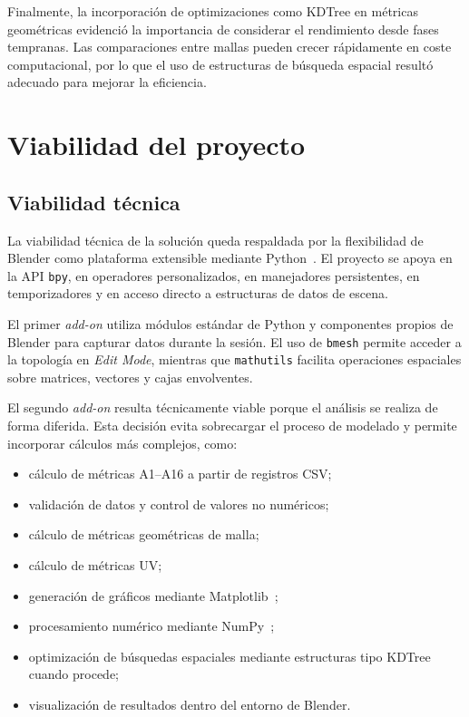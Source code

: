 Finalmente, la incorporación de optimizaciones como KDTree en métricas geométricas evidenció la importancia de considerar el rendimiento desde fases tempranas. Las comparaciones entre mallas pueden crecer rápidamente en coste computacional, por lo que el uso de estructuras de búsqueda espacial resultó adecuado para mejorar la eficiencia.

\section{Viabilidad del proyecto}
\label{sec:a-viabilidad}

\subsection{Viabilidad técnica}
\label{subsec:a-viabilidad-tecnica}

La viabilidad técnica de la solución queda respaldada por la flexibilidad de Blender como plataforma extensible mediante Python~\cite{pythonlang}. El proyecto se apoya en la API \texttt{bpy}, en operadores personalizados, en manejadores persistentes, en temporizadores y en acceso directo a estructuras de datos de escena.

El primer \textit{add-on} utiliza módulos estándar de Python y componentes propios de Blender para capturar datos durante la sesión. El uso de \texttt{bmesh} permite acceder a la topología en \textit{Edit Mode}, mientras que \texttt{mathutils} facilita operaciones espaciales sobre matrices, vectores y cajas envolventes.

El segundo \textit{add-on} resulta técnicamente viable porque el análisis se realiza de forma diferida. Esta decisión evita sobrecargar el proceso de modelado y permite incorporar cálculos más complejos, como:

\begin{itemize}
    \item cálculo de métricas A1--A16 a partir de registros CSV;
    \item validación de datos y control de valores no numéricos;
    \item cálculo de métricas geométricas de malla;
    \item cálculo de métricas UV;
    \item generación de gráficos mediante Matplotlib~\cite{matplotlib};
    \item procesamiento numérico mediante NumPy~\cite{numpy};
    \item optimización de búsquedas espaciales mediante estructuras tipo KDTree cuando procede;
    \item visualización de resultados dentro del entorno de Blender.
\end{itemize}

